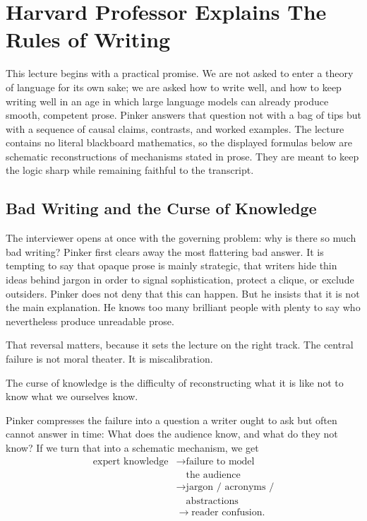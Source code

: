 \chapter{Harvard Professor Explains The Rules of Writing}

This lecture begins with a practical promise. We are not asked to enter a theory of language for its own sake; we are asked how to write well, and how to keep writing well in an age in which large language models can already produce smooth, competent prose. Pinker answers that question not with a bag of tips but with a sequence of causal claims, contrasts, and worked examples. The lecture contains no literal blackboard mathematics, so the displayed formulas below are schematic reconstructions of mechanisms stated in prose. They are meant to keep the logic sharp while remaining faithful to the transcript.

\section{Bad Writing and the Curse of Knowledge}

The interviewer opens at once with the governing problem: why is there so much bad writing? Pinker first clears away the most flattering bad answer. It is tempting to say that opaque prose is mainly strategic, that writers hide thin ideas behind jargon in order to signal sophistication, protect a clique, or exclude outsiders. Pinker does not deny that this can happen. But he insists that it is not the main explanation. He knows too many brilliant people with plenty to say who nevertheless produce unreadable prose.

That reversal matters, because it sets the lecture on the right track. The central failure is not moral theater. It is miscalibration.

\begin{definition}
The curse of knowledge is the difficulty of reconstructing what it is like not to know what we ourselves know.
\end{definition}

Pinker compresses the failure into a question a writer ought to ask but often cannot answer in time: What does the audience know, and what do they not know? If we turn that into a schematic mechanism, we get
\begin{equation}
\begin{aligned}
\text{expert knowledge}
&\to \text{failure to model} \\
&\quad \text{the audience} \\
&\to \text{jargon / acronyms /} \\
&\quad \text{abstractions} \\
&\to \text{reader confusion}.
\end{aligned}
\end{equation}

